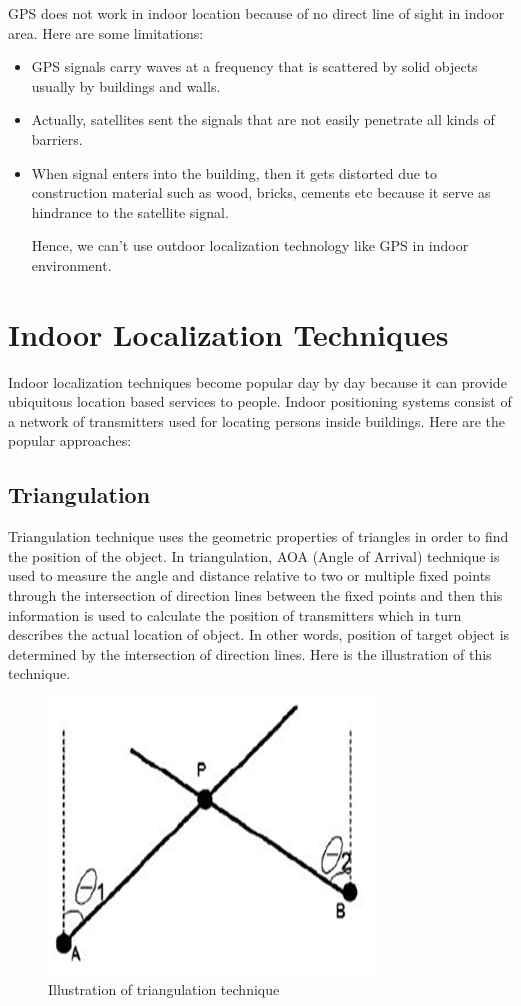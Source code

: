 GPS does not work in indoor location because of no direct line of sight in indoor area. Here are some limitations:
\begin{itemize}
\item GPS signals carry waves at a frequency that is scattered by solid objects usually by buildings and walls.
\item Actually, satellites sent the signals that are not easily penetrate all kinds of barriers.
\item	When signal enters into the building, then it gets distorted due to construction material such as wood, bricks, cements etc because it serve as hindrance to the satellite signal.\cite{IP}

Hence, we can’t use outdoor localization technology like GPS in indoor environment.
\end{itemize}


\section{Indoor Localization Techniques}
Indoor localization techniques become popular day by day because it can provide ubiquitous location based services to people. Indoor positioning systems consist of a network of transmitters used for locating persons inside buildings. Here are the popular approaches: 
\subsection{Triangulation}
Triangulation technique uses the geometric properties of triangles in order to find the position of the object. In triangulation, AOA (Angle of Arrival)\cite{Sakpere2017ASS} technique is used to measure the angle and distance relative to two or multiple fixed points through the intersection of direction lines between the fixed points and then this information is used to calculate the position of transmitters which in turn describes the actual location of object.  In other words, position of target object is determined by the intersection of direction lines. Here is the illustration of this technique.
\begin{figure}[h]
  		\centering
    		\includegraphics[scale=0.7]{./Figures/triangulation}
\caption{Illustration of triangulation technique}
\label{fig:2}
 		\end{figure}

